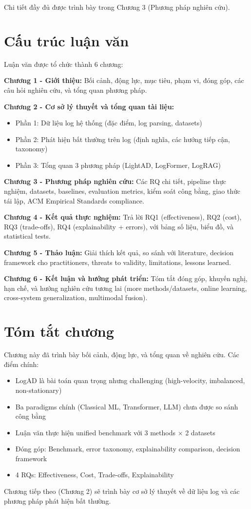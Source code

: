 Chi tiết đầy đủ được trình bày trong Chương 3 (Phương pháp nghiên cứu).

\section{Cấu trúc luận văn}
\label{sec:thesis-structure}

Luận văn được tổ chức thành 6 chương:

\textbf{Chương 1 - Giới thiệu:} Bối cảnh, động lực, mục tiêu, phạm vi, đóng góp, các câu hỏi nghiên cứu, và tổng quan phương pháp.

\textbf{Chương 2 - Cơ sở lý thuyết và tổng quan tài liệu:} 
\begin{itemize}
    \item Phần 1: Dữ liệu log hệ thống (đặc điểm, log parsing, datasets)
    \item Phần 2: Phát hiện bất thường trên log (định nghĩa, các hướng tiếp cận, taxonomy)
    \item Phần 3: Tổng quan 3 phương pháp (LightAD, LogFormer, LogRAG)
\end{itemize}

\textbf{Chương 3 - Phương pháp nghiên cứu:} Các RQ chi tiết, pipeline thực nghiệm, datasets, baselines, evaluation metrics, kiểm soát công bằng, giao thức tái lập, ACM Empirical Standards compliance.

\textbf{Chương 4 - Kết quả thực nghiệm:} Trả lời RQ1 (effectiveness), RQ2 (cost), RQ3 (trade-offs), RQ4 (explainability + errors), với bảng số liệu, biểu đồ, và statistical tests.

\textbf{Chương 5 - Thảo luận:} Giải thích kết quả, so sánh với literature, decision framework cho practitioners, threats to validity, limitations, lessons learned.

\textbf{Chương 6 - Kết luận và hướng phát triển:} Tóm tắt đóng góp, khuyến nghị, hạn chế, và hướng nghiên cứu tương lai (more methods/datasets, online learning, cross-system generalization, multimodal fusion).

\section{Tóm tắt chương}
\label{sec:chapter-summary}

Chương này đã trình bày bối cảnh, động lực, và tổng quan về nghiên cứu. Các điểm chính:

\begin{itemize}
    \item LogAD là bài toán quan trọng nhưng challenging (high-velocity, imbalanced, non-stationary)
    \item Ba paradigms chính (Classical ML, Transformer, LLM) chưa được so sánh công bằng
    \item Luận văn thực hiện unified benchmark với 3 methods $\times$ 2 datasets
    \item Đóng góp: Benchmark, error taxonomy, explainability comparison, decision framework
    \item 4 RQs: Effectiveness, Cost, Trade-offs, Explainability
\end{itemize}

Chương tiếp theo (Chương 2) sẽ trình bày cơ sở lý thuyết về dữ liệu log và các phương pháp phát hiện bất thường.
